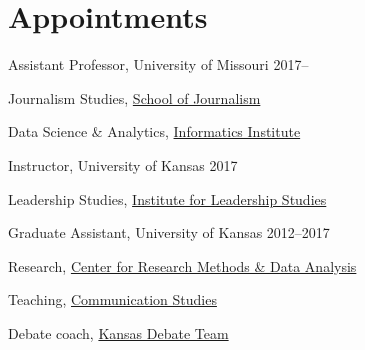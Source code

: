 
\section{Appointments}

Assistant Professor, University of Missouri                    \hfill 2017--

  \begin{outerlist}
    \item[] Journalism Studies, \href{http://journalism.missouri.edu/}{School of Journalism}
    \item[] Data Science \& Analytics, \href{https://muii.missouri.edu/}{Informatics Institute}
  \end{outerlist}\vspace{.2in}

Instructor, University of Kansas                               \hfill 2017

  \begin{outerlist}
    \item[] Leadership Studies, \href{https://ils.ku.edu/about/}{Institute for Leadership Studies}
  \end{outerlist}\vspace{.2in}

Graduate Assistant, University of Kansas                       \hfill 2012--2017

  \begin{outerlist}
    \item[] Research, \href{http://www.crmda.ku.edu/}{Center for Research Methods \& Data Analysis}
    \item[] Teaching, \href{http://www.coms.ku.edu/}{Communication Studies}
    \item[] Debate coach, \href{http://www.debate.ku.edu/}{Kansas Debate Team}
  \end{outerlist}
